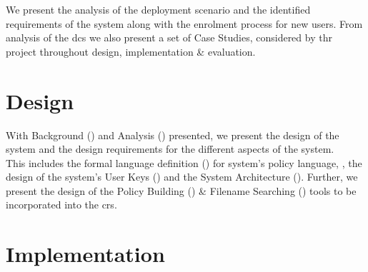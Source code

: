 \documentclass[british,table,svgnames,xcdraw]{l4proj}
\begin{document}
We present the analysis of the deployment scenario and the identified requirements of the \theResServer system along with the enrolment process for new users. From analysis of the \acrfull{dcs} we also present a set of Case Studies, considered by thr project throughout design, implementation \& evaluation.









\chapter{Design}
\label{ch:design}

With Background () and Analysis () presented, we present the design of the \theResServer system and the design requirements for the different aspects of the system.\\
This includes the formal language definition () for \theResServer system's policy language, \thePolicyLang, the design of the system's User Keys () and the System Architecture (). Further, we present the design of the Policy Building () \& Filename Searching () tools to be incorporated into the \acrfull{crs}.















\chapter{Implementation}
\label{ch:implementation}
\end{document}
